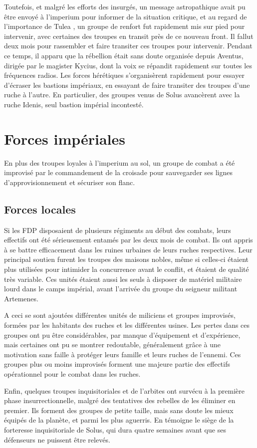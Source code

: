 \documentclass[10pt,a4paper]{book}
\newcommand{\zone}{Tulea }
\begin{document}
Toutefois, et malgré les efforts des insurgés, un message astropathique avait pu être envoyé à l'imperium pour informer de la situation critique, et au regard de l'importance de \zone , un groupe de renfort fut rapidement mis sur pied pour intervenir, avec certaines des troupes en transit près de ce nouveau front. Il fallut deux mois pour rassembler et faire transiter ces troupes pour intervenir. 
Pendant ce temps, il apparu que la rébellion était sans doute organisée depuis Aventus, dirigée par le magister Kycius, dont la voix se répandit rapidement sur toutes les fréquences radios. Les forces hérétiques s'organisèrent rapidement pour essayer d'écraser les bastions impériaux, en essayant de faire transiter des troupes d'une ruche à l'autre. En particulier, des groupes venus de Solus avancèrent avec la ruche Idenis, seul bastion impérial incontesté.
\chapter{Forces impériales}
En plus des troupes loyales à l'imperium au sol, un groupe de combat a été improvisé par le commandement de la croisade pour sauvegarder ses lignes d'approvisionnement et sécuriser son flanc.
\section{Forces locales}
Si les FDP disposaient de plusieurs régiments au début des combats, leurs effectifs ont été sérieusement entamés par les deux mois de combat. Ils ont appris à se battre efficacement dans les ruines urbaines de leurs ruches respectives. Leur principal soutien furent les troupes des maisons nobles, même si celles-ci étaient plus utilisées pour intimider la concurrence avant le conflit, et étaient de qualité très variable. Ces unités étaient aussi les seuls à disposer de matériel militaire lourd dans le camps impérial, avant l'arrivée du groupe du seigneur militant Artemenes.

A ceci se sont ajoutées différentes unités de miliciens et groupes improvisés, formées par les habitants des ruches et les différentes usines. Les pertes dans ces groupes ont pu être considérables, par manque d'équipement et d'expérience, mais certaines ont pu se montrer redoutable, généralement grâce à une motivation sans faille à protéger leurs famille et leurs ruches de l'ennemi. Ces groupes plus ou moins improvisés forment une majeure partie des effectifs opérationnel pour le combat dans les ruches.

Enfin, quelques troupes inquisitoriales et de l'arbites ont survécu à la première phase insurrectionnelle, malgré des tentatives des rebelles de les éliminer en premier. Ils forment des groupes de petite taille, mais sans doute les mieux équipés de la planète, et parmi les plus aguerris. En témoigne le siège de la forteresse inquisitoriale de Solus, qui dura quatre semaines avant que ses défenseurs ne puissent être relevés.
\end{document}
